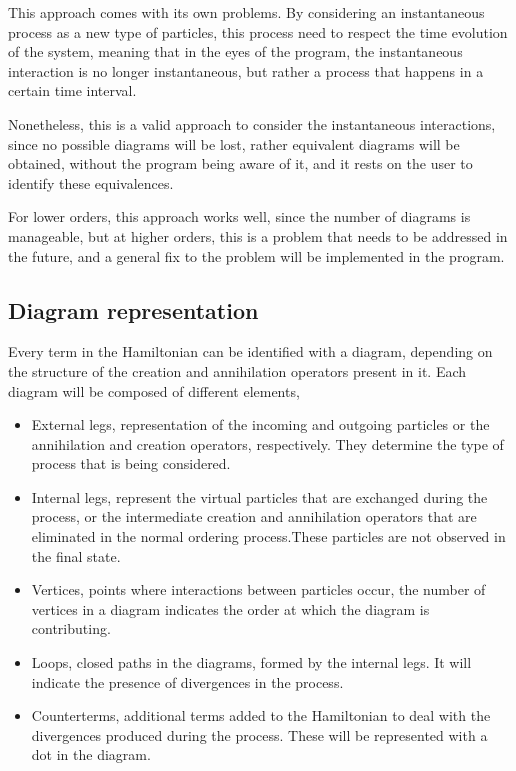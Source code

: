 \documentclass[11pt,a4paper,twoside,pdf]{article}
\numberwithin{equation}{section}
\begin{document}
This approach comes with its own problems. By considering an instantaneous 
process as a new type of particles, this process need to respect the time 
evolution of the system, meaning that in the eyes of the program, the 
instantaneous interaction is no longer instantaneous, but rather a process that
happens in a certain time interval. 

Nonetheless, this is a valid approach to consider the instantaneous interactions, 
since no possible diagrams will be lost, rather equivalent diagrams will be 
obtained, without the program being aware of it, and it rests on the user to
identify these equivalences. 

For lower orders, this approach works well, since the number of diagrams is
manageable, but at higher orders, this is a problem that needs to be addressed in 
the future, and a general fix to the problem will be implemented in the program.

\subsection{Diagram representation}

Every term in the Hamiltonian can be identified with a diagram, depending on the 
structure of the creation and annihilation operators present in it. Each diagram 
will be composed of different elements, 

\begin{itemize}
    \item External legs, representation of the incoming and outgoing particles or 
    the annihilation and creation operators, respectively. They determine the type 
    of process that is being considered.
    \item Internal legs, represent the virtual particles that are exchanged during the
    process, or the intermediate creation and annihilation operators that are 
    eliminated in the normal ordering process.These particles are not observed in 
    the final state.
    \item Vertices, points where interactions between particles occur, the number of
    vertices in a diagram indicates the order at which the diagram is contributing.
    \item Loops, closed paths in the diagrams, formed by the internal legs. It will
    indicate the presence of divergences in the process.
    \item Counterterms, additional terms added to the Hamiltonian to deal with the divergences
    produced during the process. These will be represented with a dot in the diagram.
\end{itemize}
\end{document}
